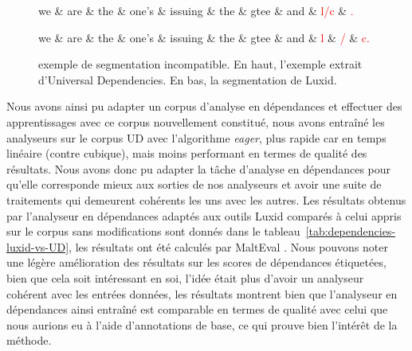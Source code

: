 \documentclass[12pt,a4paper,times,twoside,openright]{report}
\begin{document}
\begin{figure}[ht!]
\centering
\begin{dependency}[theme = simple]
   \begin{deptext}[column sep=1.75em]
      we \& are \& the \& one's \& issuing \& the \& gtee \& and \& \textcolor{red}{l/c} \& \textcolor{red}{.} \\
   \end{deptext}
\end{dependency}
\begin{dependency}[theme = simple]
   \begin{deptext}[column sep=1.75em]
      we \& are \& the \& one's \& issuing \& the \& gtee \& and \& \textcolor{red}{l} \& \textcolor{red}{/} \& \textcolor{red}{c.} \\
   \end{deptext}
\end{dependency}
\caption{exemple de segmentation incompatible. En haut, l'exemple extrait d'Universal Dependencies. En bas, la segmentation de Luxid.}
\label{fig:dependency-example2}
\end{figure}

Nous avons ainsi pu adapter un corpus d'analyse en dépendances et effectuer des apprentissages avec ce corpus nouvellement constitué, nous avons entraîné les analyseurs sur le corpus UD avec l'algorithme \emph{eager}, plus rapide car en temps linéaire (contre cubique), mais moins performant en termes de qualité des résultats. Nous avons donc pu adapter la tâche d'analyse en dépendances pour qu'elle corresponde mieux aux sorties de nos analyseurs et avoir une suite de traitements qui demeurent cohérents les uns avec les autres. Les résultats obtenus par l'analyseur en dépendances adaptés aux outils Luxid comparés à celui appris sur le corpus sans modifications sont donnés dans le tableau\ \ref{tab:dependencies-luxid-vs-UD}, les résultats ont été calculés par MaltEval \citep{nilsson2008malteval}. Nous pouvons noter une légère amélioration des résultats sur les scores de dépendances étiquetées, bien que cela soit intéressant en soi, l'idée était plus d'avoir un analyseur cohérent avec les entrées données, les résultats montrent bien que l'analyseur en dépendances ainsi entraîné est comparable en termes de qualité avec celui que nous aurions eu à l'aide d'annotations de base, ce qui prouve bien l'intérêt de la méthode.
\end{document}
